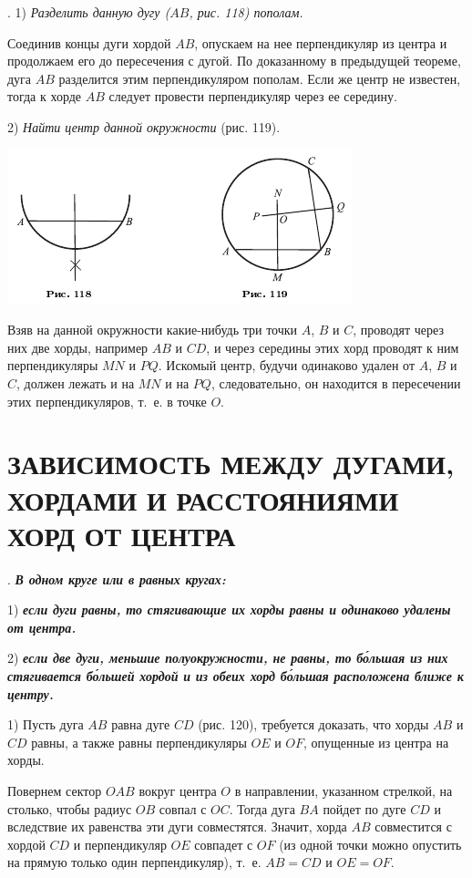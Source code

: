\documentclass[oneside]{book}
\begin{document}
.
1) \emph{Разделить данную дугу \emph{($AB$, рис. 118)} пополам.}

Соединив концы дуги хордой $AB$, опускаем на нее перпендикуляр из центра и продолжаем его до пересечения с дугой.
По доказанному в предыдущей теореме, дуга $AB$ разделится этим перпендикуляром пополам.
Если же центр не известен, тогда к хорде $AB$ следует провести перпендикуляр через ее середину.

2) \emph{Найти центр данной окружности} (рис. 119).

\includegraphics{pics/ris-118-119}

Взяв на данной окружности какие-нибудь три точки $A$, $B$ и $C$, проводят через них две хорды, например $AB$ и $CD$, и через середины этих хорд проводят к ним перпендикуляры $MN$ и $PQ$.
Искомый центр, будучи одинаково удален от $A$, $B$ и $C$, должен лежать и на $MN$ и на $PQ$, следовательно, он находится в пересечении этих перпендикуляров, т.~е. в точке $O$.

\section{ЗАВИСИМОСТЬ МЕЖДУ ДУГАМИ,\\ ХОРДАМИ И РАССТОЯНИЯМИ ХОРД ОТ ЦЕНТРА}

.
\textbf{\emph{В одном круге или в равных кругах:}}

1) \textbf{\emph{если дуги равны, то стягивающие их хорды равны и одинаково удалены от центра.}}

2) \textbf{\emph{если две дуги, меньшие полуокружности, не равны, то б\'{о}льшая из них стягивается б\'{о}льшей хордой и из обеих хорд б\'{о}льшая расположена ближе к центру.}}

1) Пусть дуга $AB$ равна дуге $CD$ (рис. 120), требуется доказать, что хорды $AB$ и $CD$ равны, а также равны перпендикуляры $OE$ и $OF$, опущенные из центра на хорды.

Повернем сектор $OAB$ вокруг центра $O$ в направлении, указанном стрелкой, на столько, чтобы радиус $OB$ совпал с $OC$.
Тогда дуга $BA$ пойдет по дуге $CD$ и вследствие их равенства эти дуги совместятся.
Значит, хорда $AB$ совместится с хордой $CD$ и перпендикуляр $OE$ совпадет с $OF$ (из одной точки можно опустить на прямую только один перпендикуляр), т.~е.
$AB=CD$ и $OE=OF$.
\end{document}
